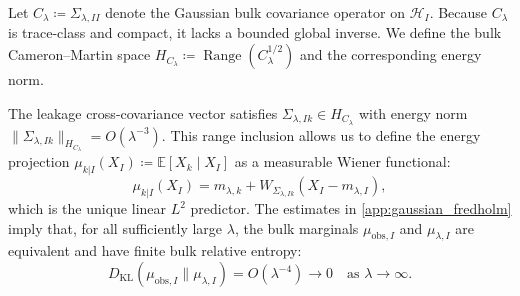 \documentclass[preprint,12pt]{elsarticle}
\theoremstyle{plain}
\theoremstyle{definition}
\theoremstyle{remark}
\newcommand{\KL}{D_{\operatorname{KL}}}
\newcommand{\E}{\mathbb{E}}
\begin{document}
    Let $C_\lambda \coloneqq \Sigma_{\lambda,II}$ denote the Gaussian bulk covariance operator on $\mathcal{H}_I$. Because $C_\lambda$ is trace-class and compact, it lacks a bounded global inverse. We define the bulk Cameron--Martin space $H_{C_\lambda} \coloneqq \operatorname{Range}(C_\lambda^{1/2})$ and the corresponding energy norm.

    The leakage cross-covariance vector satisfies $\Sigma_{\lambda,Ik} \in H_{C_\lambda}$ with energy norm $\|\Sigma_{\lambda,Ik}\|_{H_{C_\lambda}} = O(\lambda^{-3})$. This range inclusion allows us to define the energy projection $\mu_{k|I}(X_I) \coloneqq \E[X_k \mid X_I]$ as a measurable Wiener functional:
    \begin{equation}
        \mu_{k|I}(X_I) = m_{\lambda,k} + W_{\Sigma_{\lambda,Ik}}(X_I - m_{\lambda,I}),
    \end{equation}
    which is the unique linear $L^2$ predictor. The estimates in \ref{app:gaussian_fredholm} imply that, for all sufficiently large $\lambda$, the bulk marginals $\mu_{\text{obs},I}$ and $\mu_{\lambda,I}$ are equivalent and have finite bulk relative entropy:
    \begin{equation}
        \KL(\mu_{\text{obs},I} \parallel \mu_{\lambda,I}) = O(\lambda^{-4}) \to 0 \quad \text{as } \lambda \to \infty.
    \end{equation}
\end{document}

